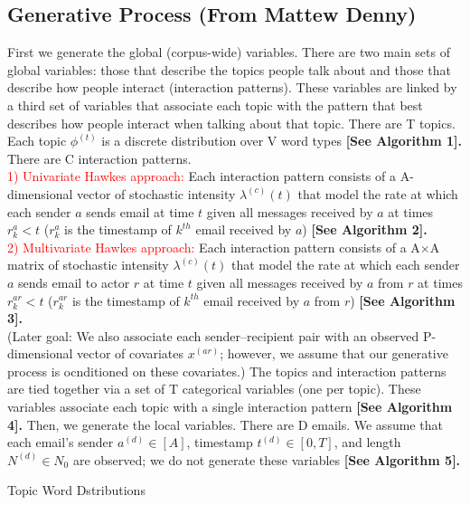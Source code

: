 \documentclass[a4paper]{article}
\begin{document}
\subsection{Generative Process (From Mattew Denny)}
First we generate the global (corpus-wide) variables. There are two main sets of global variables: those that describe the
topics people talk about and those that describe how people interact (interaction patterns). These variables are linked by a
third set of variables that associate each topic with the pattern that best describes how people interact when talking about
that topic. There are T topics. Each topic $\phi^{(t)}$ is a discrete distribution over V word types \textbf{[See Algorithm 1].} There are C
interaction patterns. \\ \newline \textcolor{red}{1) Univariate Hawkes approach:} Each interaction pattern consists of a A-dimensional vector of stochastic intensity $\lambda^{(c)}(t)$ that model the rate at which each sender $a$ sends email at time $t$ given all messages received by $a$ at times
$r_k^{a}< t$ ($r_k^{a}$ is the timestamp of $k^{th}$ email received by $a$)  \textbf{[See Algorithm 2].}  \\ \newline
 \textcolor{red}{2) Multivariate Hawkes approach:} Each interaction pattern consists of a A$\times$A matrix of stochastic intensity $\lambda^{(c)}(t)$ that model the rate at which each sender $a$ sends email to actor $r$ at time $t$ given all messages received by $a$ from $r$ at times
 	$r_k^{ar}< t$ ($r_k^{ar}$ is the timestamp of $k^{th}$ email received by $a$ from $r$)  \textbf{[See Algorithm 3].}  \\\newline  (Later goal: We also associate each sender–recipient pair with an observed P-dimensional
vector of covariates $x^{(ar)}$; however, we assume that our generative process is ocnditioned on these covariates.)  The topics and interaction patterns are tied together via a set of T categorical variables (one per topic). These variables
associate each topic with a single interaction pattern \textbf{[See Algorithm 4].} Then, we generate the local variables. There are D
emails. We assume that each email’s sender $a^{(d)}\in [A]$, timestamp $t^{(d)} \in [0, T]$, and length $N^{(d)} \in N_0$ are observed; we do not generate these variables  \textbf{[See Algorithm 5].}
 \begin{algorithm}[H]
 	\SetAlgoLined
	\caption{Topic Word Dstributions}
\end{algorithm}
\end{document}
